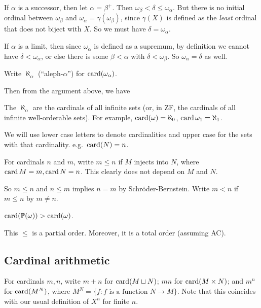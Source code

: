 \documentclass[a4paper]{article}
\begin{document}
If $\alpha$ is a successor, then let $\alpha = \beta^+$. Then $\omega_\beta < \delta \leq \omega_\alpha$. But there is no initial ordinal between $\omega_\beta$ and $\omega_\alpha = \gamma(\omega_\beta)$, since $\gamma(X)$ is defined as the \emph{least} ordinal that does not biject with $X$. So we must have $\delta = \omega_\alpha$.

If $\alpha$ is a limit, then since $\omega_\alpha$ is defined as a supremum, by definition we cannot have $\delta < \omega_\alpha$, or else there is some $\beta < \alpha$ with $\delta < \omega_\beta$. So $\omega_\alpha = \delta$ as well.

\begin{defi}\index{$\aleph_\alpha$}
  Write $\aleph_\alpha$ (``aleph-$\alpha$'') for $\operatorname{card}(\omega_\alpha)$.
\end{defi}

Then from the argument above, we have
\begin{thm}
  The $\aleph_\alpha$ are the cardinals of all infinite sets (or, in ZF, the cardinals of all infinite well-orderable sets). For example, $\operatorname{card}(\omega) = \aleph_0$, $\operatorname{card} \omega_1 = \aleph_1$.
\end{thm}

We will use lower case letters to denote cardinalities and upper case for the sets with that cardinality. e.g.\ $\operatorname{card}(N) = n$.

\begin{defi}
  For cardinals $n$ and $m$, write $m \leq n$ if $M$ injects into $N$, where $\operatorname{card} M = m, \operatorname{card} N = n$. This clearly does not depend on $M$ and $N$.

  So $m \leq n$ and $n\leq m$ implies $n = m$ by Schr\"oder-Bernstein. Write $m < n$ if $m \leq n$ by $m\not = n$.
\end{defi}

\begin{eg}
  $\operatorname{card}(\mathbb{P}(\omega)) > \operatorname{card}(\omega)$.
\end{eg}

This $\leq$ is a partial order. Moreover, it is a total order (assuming AC).

\subsection{Cardinal arithmetic}
\begin{defi}
  For cardinals $m, n$, write $m + n$ for $\operatorname{card}(M\sqcup N)$; $mn$ for $\operatorname{card}(M\times N)$; and $m^n$ for $\operatorname{card}(M^N)$, where $M^N = \{f: f\text{ is a function }N\to M\}$. Note that this coincides with our usual definition of $X^n$ for finite $n$.
\end{defi}
\end{document}
